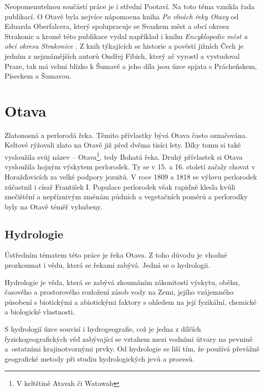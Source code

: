 \documentclass[thesis=M,czech]{FITthesis}[2012/06/26]
\begin{document}
Neopomenutelnou součástí práce je i střední Pootaví. Na toto téma vznikla řada publikací. O Otavě byla nejvíce nápomocna kniha \textit{Po vlnách řeky Otavy} \cite{SMOOS} od Eduarda Oberfalcera, který spolupracuje se Svazkem měst a obcí okresu Strakonic a kromě této publikace vydal například i knihu \textit{Encyklopedie měst a obcí okresu Strakonice} \cite{obce}. Z knih týkajících se historie a pověstí jižních Čech je jedním z nejznámějších autorů Ondřej Fibich, který ač vyrostl a vystudoval Praze, tak má velmi blízko k Šumavě a jeho díla jsou úzce spjata s Prácheňskem, Píseckem a Šumavou.










\chapter{Otava}
Zlatonosná a perlorodá řeka. Těmito přívlastky bývá Otava často označována. Keltové rýžovali zlato na Otavě již před dvěma tisíci lety. Díky tomu si také vysloužila svůj název – Otava\footnote{V keltštině Atavah či Watawah}, tedy Bohatá řeka. Druhý přívlastek si Otava vysloužila hojným výskytem perlorodek. Ty se v 15. a 16. století začaly chovat v Horažďovicích za velké podpory jezuitů. V roce 1809 a 1818 se výlovu perlorodek zúčastnil i císař František I. Populace perlorodek však rapidně klesla kvůli znečištění a nepříznivým změnám půdních a vegetačních poměrů a perlorodky byly na Otavě téměř vyhubeny. \cite{SMOOS}


\section{Hydrologie}
Ústředním tématem této práce je řeka Otava. Z toho důvodu je vhodné prozkoumat i vědu, která se řekami zabývá. Jedná se o hydrologii.


Hydrologie je věda, která se zabývá zkoumáním zákonitostí výskytu, oběhu, časového a prostorového rozložení zásob vody na Zemi, jejího vzájemného působení s biotickými a abiotickými faktory s ohledem na její fyzikální, chemické a biologické vlastnosti. 


S hydrologií úzce souvisí i hydrogeografie, což je jedna z dílčích fyzickogeografických věd zabývající se vztahem mezi vodními útvary na pevnině a~ostatními krajinotvornými prvky. Od hydrologie se liší tím, že používá převážně geografické metody při studiu hydrologických jevů a procesů. 
\end{document}
